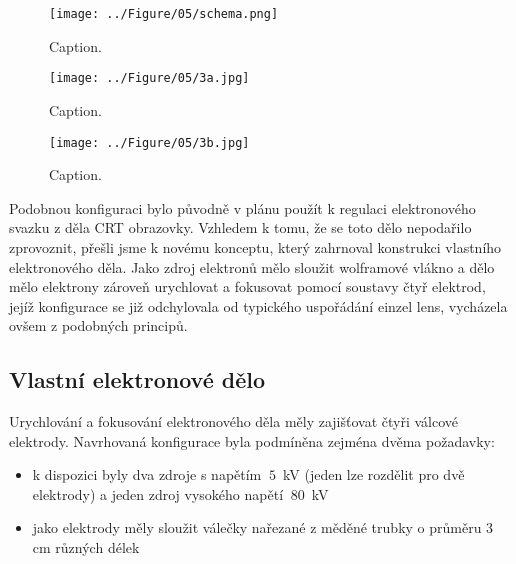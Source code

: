 \begin{figure}[htbp!]
\centering
\texttt{[image: ../Figure/05/schema.png]}
\caption{Caption.}
\label{05schemaEinzelLens}
\end{figure}

\begin{figure}[htbp!]
\centering
\texttt{[image: ../Figure/05/3a.jpg]}
\caption{Caption.}
\label{05simulaceEinzelLens}
\end{figure}

\begin{figure}[htbp!]
\centering
\texttt{[image: ../Figure/05/3b.jpg]}
\caption{Caption.}
\label{05simulaceEinzelLensPotencial}
\end{figure}

Podobnou konfiguraci bylo původně v plánu použít k regulaci elektronového svazku z děla CRT obrazovky. Vzhledem k tomu, že se toto dělo nepodařilo zprovoznit, přešli jsme k novému konceptu, který zahrnoval konstrukci vlastního elektronového děla. Jako zdroj elektronů mělo sloužit wolframové vlákno a dělo mělo elektrony zároveň urychlovat a fokusovat pomocí soustavy čtyř elektrod, jejíž konfigurace se již odchylovala od typického uspořádání einzel lens, vycházela ovšem z podobných principů.\\

\subsection{Vlastní elektronové dělo}

Urychlování a fokusování elektronového děla měly zajišťovat čtyři válcové elektrody. Navrhovaná konfigurace byla podmíněna zejména dvěma požadavky:
\begin{itemize}
	\item k dispozici byly dva zdroje s napětím $~5$~kV (jeden lze rozdělit pro dvě elektrody) a jeden zdroj vysokého napětí $~80$~kV
	\item jako elektrody měly sloužit válečky nařezané z měděné trubky o průměru 3 cm různých délek
\end{itemize}

